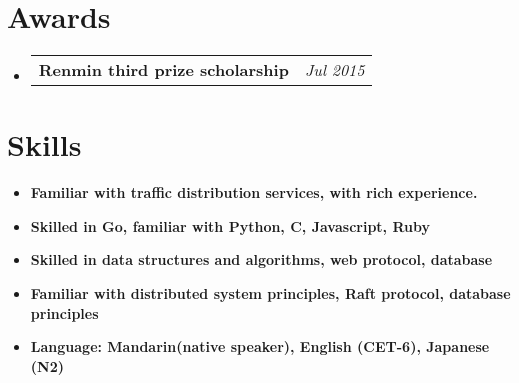 \documentclass[UTF8,11pt]{article}
\makeatletter
\newcommand{\resumeItem}[2]{
  \item\small{
    \textbf{#1}{ #2 \vspace{-1pt}}
  }
}
\newcommand{\resumeSubItem}[2]{\vspace{2pt}\resumeItem{#1}{#2}\vspace{-7pt}}
\newcommand{\resumeListSubItem}[2]{
  \vspace{-1pt}\item
    \begin{tabular*}{0.97\textwidth}{l@{\extracolsep{\fill}}r}
      \textbf{#1} & \textit{\small #2} \\
    \end{tabular*}\vspace{-6pt}
}
\newcommand{\resumeSubHeadingListStart}{\begin{itemize}[leftmargin=*]}
\newcommand{\resumeSubHeadingListEnd}{\end{itemize}}\vspace{-12pt}}
\makeatother
\begin{document}
\section{Awards}
  \resumeSubHeadingListStart
    \resumeListSubItem
      {Renmin third prize scholarship}{Jul 2015}
  \resumeSubHeadingListEnd
%
\section{Skills}
  \resumeSubHeadingListStart
    \resumeSubItem{Familiar with traffic distribution services, with rich experience.}
      {}
    \resumeSubItem{Skilled in Go, familiar with Python, C, Javascript, Ruby}
      {}
    \resumeSubItem{Skilled in data structures and algorithms, web protocol, database}
      {}
    \resumeSubItem{Familiar with distributed system principles, Raft protocol, database principles}
      {}
    \resumeSubItem{Language: Mandarin(native speaker), English (CET-6), Japanese (N2)}
      {}
  \resumeSubHeadingListEnd


\end{document}
